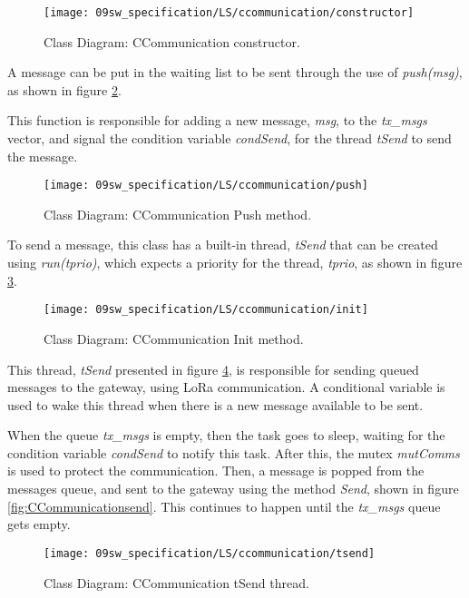 \begin{figure}[H]
	\centering
	\texttt{[image: 09sw\_specification/LS/ccommunication/constructor]}
	\caption{Class Diagram: CCommunication constructor.}
	\label{fig:CCommunicationConstructor}
\end{figure}

A message can be put in the waiting list to be sent through the use of \textit{push(msg)}, as shown in figure \ref{fig:CCommunicationPush}.

This function is responsible for adding a new message, \textit{msg}, to the \textit{tx\_msgs} vector, and signal the condition variable \textit{condSend}, for the thread \textit{tSend} to send the message.

\begin{figure}[H]
	\centering
	\texttt{[image: 09sw\_specification/LS/ccommunication/push]}
	\caption{Class Diagram: CCommunication Push method.}
	\label{fig:CCommunicationPush}
\end{figure}

To send a message, this class has a built-in thread, \textit{tSend} that can be created using \textit{run(tprio)}, which expects a priority for the thread, \textit{tprio}, as shown in figure \ref{fig:CCommunicationinit}.

\begin{figure}[H]
	\centering
	\texttt{[image: 09sw\_specification/LS/ccommunication/init]}
	\caption{Class Diagram: CCommunication Init method.}
	\label{fig:CCommunicationinit}
\end{figure}

This thread, \textit{tSend} presented in figure \ref{fig:CCommunicationtsend}, is responsible for sending queued messages to the gateway, using LoRa communication. A conditional variable is used to wake this thread when there is a new message available to be sent.

When the queue \textit{tx\_msgs} is empty, then the task goes to sleep, waiting for the condition variable \textit{condSend} to notify this task. After this, the mutex \textit{mutComms} is used to protect the communication. Then, a message is popped from the messages queue, and sent to the gateway using the method \textit{Send}, shown in figure \ref{fig:CCommunicationsend}. This continues to happen until the \textit{tx\_msgs} queue gets empty.

\begin{figure}[H]
	\centering
	\texttt{[image: 09sw\_specification/LS/ccommunication/tsend]}
	\caption{Class Diagram: CCommunication tSend thread.}
	\label{fig:CCommunicationtsend}
\end{figure}

